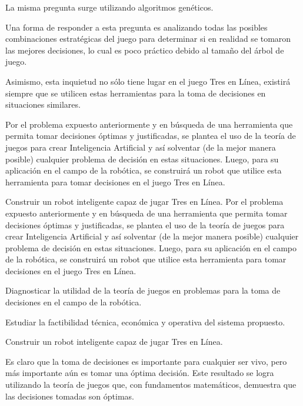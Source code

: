  La misma pregunta surge utilizando algoritmos genéticos.  

 Una forma de responder a esta pregunta es analizando todas las posibles 
combinaciones estratégicas del juego para determinar si en realidad se tomaron las 
mejores decisiones, lo cual es poco práctico debido al tamaño del árbol de juego. 
 
Asimismo, esta inquietud no sólo tiene lugar en el juego Tres en Línea, existirá 
siempre que se utilicen estas herramientas para la toma de decisiones en situaciones 
similares. 

  Por el problema expuesto anteriormente y en búsqueda de una herramienta 
que permita tomar decisiones óptimas y justificadas, se plantea el uso de la teoría de 
juegos para crear Inteligencia Artificial y así solventar (de la mejor manera posible) 
cualquier problema de decisión en estas situaciones. Luego, para su aplicación en el 
campo de la robótica, se construirá un robot que utilice esta herramienta para tomar 
decisiones en el juego Tres en Línea.  

		Construir un robot inteligente capaz de jugar Tres en Línea. 
		  Por el problema expuesto anteriormente y en búsqueda de una herramienta 
		que permita tomar decisiones óptimas y justificadas, se plantea el uso de la teoría de 
		juegos para crear Inteligencia Artificial y así solventar (de la mejor manera posible) 
		cualquier problema de decisión en estas situaciones. Luego, para su aplicación en el 
		campo de la robótica, se construirá un robot que utilice esta herramienta para tomar 
		decisiones en el juego Tres en Línea.  
		
	\begin{enumeracion}
		\item Diagnosticar la utilidad de la teoría de juegos en problemas para la toma de decisiones en el campo de la robótica. 
		\item Estudiar la factibilidad técnica, económica y operativa del sistema propuesto. 
		\item Construir un robot inteligente capaz de jugar Tres en Línea. 
	\end{enumeracion}

Es claro que la toma de decisiones es importante para cualquier ser vivo, pero 
más importante aún es tomar una óptima decisión. Este resultado se logra utilizando 
la teoría de juegos que, con fundamentos matemáticos, demuestra que las decisiones 
tomadas son óptimas. 

